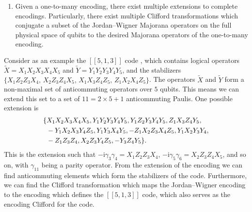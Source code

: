 \documentclass[%
 aip,
 amsmath,amssymb,
 reprint,%
]{revtex4-1}
\begin{document}
{\begin{enumerate}
    \item Given a one-to-many encoding, there exist multiple extensions to complete encodings. Particularly, there exist multiple Clifford transformations which conjugate a subset of the Jordan--Wigner Majorana operators on the full physical space of qubits to the desired Majorana operators of the one-to-many encoding.
\end{enumerate}
Consider as an example the $[[5,1,3]]$ code \cite{laflamme1996perfect, bennett1996mixed, eczoo_stab_5_1_3}, which contains logical operators $\tilde X = X_1X_2X_3X_4X_5$ and $\tilde Y = Y_1Y_2Y_3Y_4Y_5$, and the stabilizers $\{X_1Z_2Z_3X_4,\,X_2Z_3Z_4X_5,\,X_1X_3Z_4Z_5,\,Z_1X_2X_4Z_5\}$. The operators $\tilde X$ and $\tilde Y$ form a non-maximal %
set of anticommuting operators over $5$ qubits. This means we can extend this set to a set of $11 = 2\times 5 + 1$ anticommuting Paulis. One possible extension is %
\begin{align}
    \{& X_1X_2X_3X_4X_5, Y_1Y_2Y_3Y_4Y_5, Y_1Z_2Y_3Y_4Y_5, Z_1X_3Z_4Y_5, \notag\\
    & -Y_1X_2X_3Y_4Z_5, Y_1Y_3X_4Y_5, -Z_1X_2Z_3X_4Z_5, Y_1X_2Y_3Y_4, \notag\\
    & -Z_1Z_3Z_4, X_2Z_3Y_4Z_5, -Y_3Z_4Y_5\}.
    \label{eq:five-qubit-extension}
\end{align}
This is the extension such that $-\mathrm{i}\gamma_{3}\gamma_4 = X_1Z_2Z_3X_4$, $-\mathrm{i}\gamma_{5}\gamma_6 = X_2Z_3Z_4X_5$, and so on, with $\gamma_{11}$ being a parity operator. From the extension of the encoding we can find anticommuting elements which form the stabilizers of the code. Furthermore, we can find the Clifford transformation which maps the Jordan--Wigner encoding to the encoding which defines the $[[5,1,3]]$ code, which also serves as the encoding Clifford for the code. 

}
\end{document}
